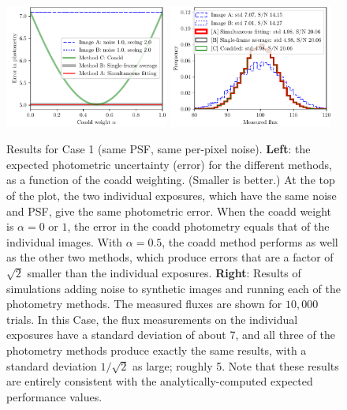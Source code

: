 \documentclass[a4paper,11pt]{article}
\begin{document}
\begin{figure}[b!]
  \begin{center}
    \includegraphics[width=0.48\textwidth]{coadd-00}
    \includegraphics[width=0.48\textwidth]{coadd-01}
  \end{center}
  \caption{Results for Case 1 (same PSF, same per-pixel noise).  \textbf{Left}: the expected photometric
    uncertainty (error) for the different methods, as a function of
    the coadd weighting.  (Smaller is better.)  At the top of the plot, the two individual
    exposures, which have the same noise and PSF, give the same
    photometric error.  When the coadd weight is $\alpha = 0$ or $1$,
    the error in the coadd photometry equals that of the individual
    images.  With $\alpha = 0.5$, the coadd method performs as well as
    the other two methods, which produce errors that are a factor of
    $\sqrt{2}$ smaller than the individual exposures.
    \newline \textbf{Right}: Results of simulations adding noise to
    synthetic images and running each of the photometry methods.  The
    measured fluxes are shown for $10,000$ trials.  In this Case, the
    flux measurements on the individual exposures have a standard
    deviation of about 7, and all three of the photometry methods
    produce exactly the same results, with a standard deviation
    $1/\sqrt{2}$ as large; roughly 5.  Note that these results are
    entirely consistent with the analytically-computed expected
    performance values.
    \label{fig:caseone}}
\end{figure}
\end{document}
